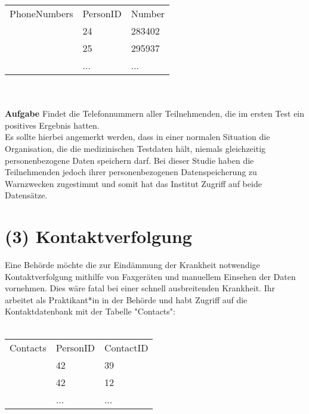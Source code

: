 \documentclass[]{article}
\begin{document}
\begin{tabular}{lll}
\multicolumn{1}{l|}{PhoneNumbers} & \multicolumn{1}{l|}{PersonID} & \multicolumn{1}{l|}{Number} \\ \cline{2-3} 
                                  & 24                            & 283402                      \\
                                  & 25                            & 295937                      \\
                                  & ...                           & ...                        
\end{tabular}\\\ \\

\textbf{Aufgabe} Findet die Telefonnummern aller Teilnehmenden, die im ersten Test ein positives Ergebnis hatten.\\
Es sollte hierbei angemerkt werden, dass in einer normalen Situation die Organisation, die die medizinischen Testdaten hält, niemals gleichzeitig personenbezogene Daten speichern darf. Bei dieser Studie haben die Teilnehmenden jedoch ihrer personenbezogenen Datenspeicherung zu Warnzwecken zugestimmt und somit hat das Institut Zugriff auf beide Datensätze. 


\newpage

\section*{(3) Kontaktverfolgung}

Eine Behörde möchte die zur Eindämmung der Krankheit notwendige Kontaktverfolgung mithilfe von Faxgeräten und manuellem Einsehen der Daten vornehmen. Dies wäre fatal bei einer schnell ausbreitenden Krankheit. Ihr arbeitet als Praktikant*in in der Behörde und habt Zugriff auf die Kontaktdatenbank mit der Tabelle "Contacts":\\\ \\

\begin{tabular}{lll}
\multicolumn{1}{l|}{Contacts} & \multicolumn{1}{l|}{PersonID} & \multicolumn{1}{l|}{ContactID} \\ \cline{2-3} 
                              & 42                            & 39                             \\
                              & 42                            & 12                             \\
                              & ...                           & ...                           
\end{tabular}\\\ \\
\end{document}
